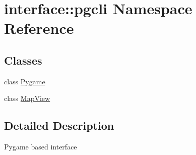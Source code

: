 \hypertarget{namespaceinterface_1_1pgcli}{\section{interface\-:\-:pgcli \-Namespace \-Reference}
\label{namespaceinterface_1_1pgcli}
}
\subsection*{\-Classes}
\begin{DoxyCompactItemize}
\item 
class \hyperlink{classinterface_1_1pgcli_1_1_pygame}{\-Pygame}
\item 
class \hyperlink{classinterface_1_1pgcli_1_1_map_view}{\-Map\-View}
\end{DoxyCompactItemize}


\subsection{\-Detailed \-Description}
\begin{DoxyVerb}
    Pygame based interface 
\end{DoxyVerb}
 